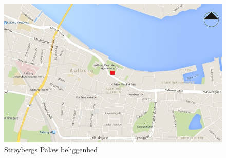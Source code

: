 \begin{figure}[htbp]
	\centering
	\includegraphics[width=1.0\textwidth]{billeder/aalborg.png}
	\caption{Strøybergs Palæs beliggenhed}
	\label{fig:aalborg}
\end{figure}


